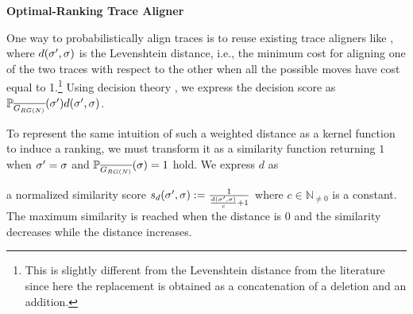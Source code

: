 \noindent
\textbf{Optimal-Ranking Trace Aligner}\label{subsec:eta}
{One way to probabilistically align traces is to reuse existing trace aligners like \cite{LeoniM17}, where $d({\sigma'},\sigma)$ 
is the Levenshtein distance, i.e., the {minimum} cost for aligning one of the two traces with respect to the other when all the possible moves have cost equal to 1.\footnote{This is slightly different from the Levenshtein distance from the literature since here the replacement is obtained as a concatenation of a deletion and an addition.} Using decision theory \cite{dectheor}, we express the decision score as  $\mathbb{P}_{\overline{G_{RG(N)}}}({\sigma'}) d({\sigma'},\sigma)$.

To represent the same intuition of such a weighted distance as a kernel function to induce a ranking, we must transform it as a 
similarity function returning $1$ when ${\sigma'}=\sigma$ and  $\mathbb{P}_{\overline{G_{RG(N)}}}(\sigma)=1$ hold. We express $d$ as}
a normalized similarity score $s_d({\sigma'},\sigma):=\frac{1}{\frac{d({\sigma'},\sigma)}{c}+1}$ where $c\in\mathbb{N}_{\neq 0}$ is a constant. The maximum similarity is reached when the distance is $0$ and the similarity decreases while the distance increases. %
